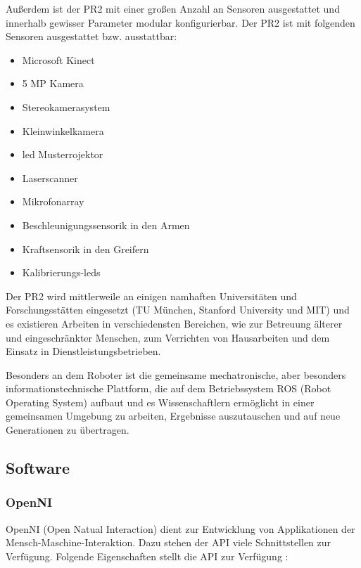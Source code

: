 Außerdem ist der PR2 mit einer großen Anzahl an Sensoren ausgestattet und innerhalb gewisser Parameter modular konfigurierbar.
Der PR2 ist mit folgenden Sensoren ausgestattet bzw. ausstattbar:

\begin{itemize}
  \item Microsoft Kinect
  \item 5 MP Kamera
  \item Stereokamerasystem
  \item Kleinwinkelkamera
  \item \gls{led} Musterrojektor
  \item Laserscanner
  \item Mikrofonarray
  \item Beschleunigungssensorik in den Armen
  \item Kraftsensorik in den Greifern
  \item Kalibrierungs-\glspl{led}
\end{itemize}

Der PR2 wird mittlerweile an einigen namhaften Universitäten und Forschungsstätten eingesetzt (\ua TU München, Stanford University und MIT) und es existieren Arbeiten in verschiedensten Bereichen, wie zur Betreuung älterer und eingeschränkter Menschen, zum Verrichten von Hausarbeiten  und dem Einsatz in Dienstleistungsbetrieben.

Besonders an dem Roboter ist die gemeinsame mechatronische, aber besonders informationstechnische Plattform, die auf dem Betriebssystem ROS (Robot Operating System)  aufbaut und es Wissenschaftlern ermöglicht in einer gemeinsamen Umgebung zu arbeiten, Ergebnisse auszutauschen und auf neue Generationen zu übertragen.



\subsection{Software}

\subsubsection{OpenNI}

OpenNI (Open Natual Interaction) dient zur Entwicklung von Applikationen der Mensch-Maschine-Interaktion.
Dazu stehen der API viele Schnittstellen zur Verfügung.
Folgende Eigenschaften stellt die API zur Verfügung \cite{kinect_6}:

